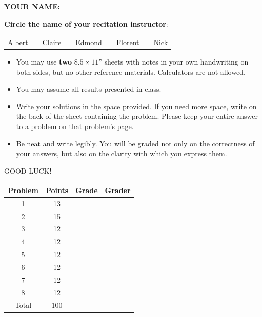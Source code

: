 \documentclass[12pt,oneside]{article}
\begin{document}

\begin{center}
\textbf{YOUR NAME: } \underline{\hspace{3in}}
\end{center}

\textbf{Circle the name of your recitation instructor}:

\begin{center}
\begin{tabular}{ccccccccc}
Albert && Claire && Edmond && Florent && Nick
\end{tabular}
\end{center}

\begin{itemize}

\item You may use \textbf{two} $8.5 \times 11$'' sheets with notes in
your own handwriting on both sides, but no other reference materials.
Calculators are not allowed.

\item You may assume all results presented in class.

\item Write your solutions in the space provided.  If you
need more space, write on the back of the sheet containing the
problem.  Please keep your entire answer to a problem on that
problem's page.

\item Be neat and write legibly.  You will be graded not only on the
correctness of your answers, but also on the clarity with which you
express them.

\end{itemize}

\centerline{GOOD LUCK!}

\vspace{0.25in}

\begin{center}
{\large
\begin{tabular}{|c|c|c|c|}
\hline
Problem & Points & Grade & Grader \\ \hline \hline
1 & 13 & & \\ \hline
2 & 15 & & \\ \hline
3 & 12 & & \\ \hline
4 & 12 & & \\ \hline
5 & 12 & & \\ \hline
6 & 12 & & \\ \hline
7 & 12 & & \\ \hline
8 & 12 & & \\ \hline
Total & 100 & & \\ \hline 
\end{tabular}
}
\end{center}
\newpage
\end{document}
